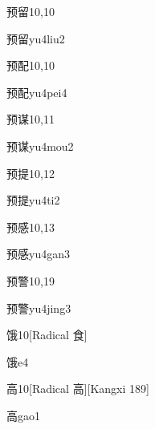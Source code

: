 \begin{entry}{预留}{10,10}
  \begin{phonetics}{预留}{yu4liu2}
  \end{phonetics}
\end{entry}

\begin{entry}{预配}{10,10}
  \begin{phonetics}{预配}{yu4pei4}
  \end{phonetics}
\end{entry}

\begin{entry}{预谋}{10,11}
  \begin{phonetics}{预谋}{yu4mou2}
  \end{phonetics}
\end{entry}

\begin{entry}{预提}{10,12}
  \begin{phonetics}{预提}{yu4ti2}
  \end{phonetics}
\end{entry}

\begin{entry}{预感}{10,13}
  \begin{phonetics}{预感}{yu4gan3}
  \end{phonetics}
\end{entry}

\begin{entry}{预警}{10,19}
  \begin{phonetics}{预警}{yu4jing3}
  \end{phonetics}
\end{entry}

\begin{entry}{饿}{10}[Radical 食]
  \begin{phonetics}{饿}{e4}
  \end{phonetics}
\end{entry}

\begin{entry}{高}{10}[Radical ⾼][Kangxi 189]
  \begin{phonetics}{高}{gao1}
  \end{phonetics}
\end{entry}

